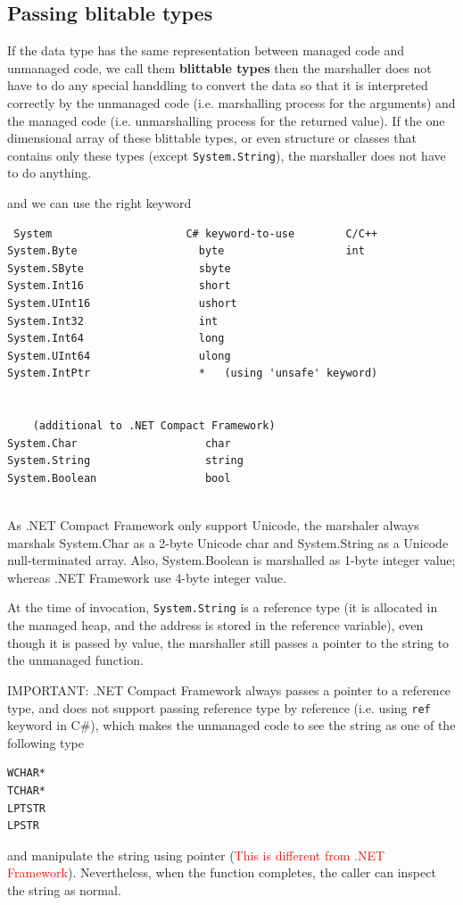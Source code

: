 \subsection{Passing blitable types}
\label{sec:marshall_blittable-types}

If the data type has the same representation between managed code and unmanaged
code, we call them {\bf blittable types} then the marshaller does not have to do
any special handdling to convert the data so that it is interpreted correctly by
the unmanaged code (i.e. marshalling process for the arguments) and
the managed code (i.e. unmarshalling process for the returned value). If the one
dimensional array of these blittable types, or even structure or classes that
contains only these types (except \verb!System.String!), the marshaller does not
have to do anything.

and we can use the right keyword
\begin{verbatim}
 System                     C# keyword-to-use        C/C++
System.Byte                   byte                   int
System.SByte                  sbyte
System.Int16                  short
System.UInt16                 ushort
System.Int32                  int
System.Int64                  long
System.UInt64                 ulong
System.IntPtr                 *   (using 'unsafe' keyword)


    (additional to .NET Compact Framework)
System.Char                    char
System.String                  string
System.Boolean                 bool
    
\end{verbatim}
As .NET Compact Framework only support Unicode, the  marshaler always marshals
System.Char as a 2-byte Unicode char and System.String as a Unicode
null-terminated array. Also, System.Boolean is marshalled as 1-byte integer
value; whereas .NET Framework use 4-byte integer value. 

At the time of invocation, \verb!System.String! is a reference type (it is
allocated in the managed heap, and the address is stored in the reference
variable), even though it is passed by value, the marshaller still passes a
pointer to the string to the unmanaged function.

IMPORTANT: .NET Compact Framework always passes a pointer to a reference type,
and does not support passing reference type by reference (i.e. using \verb!ref!
keyword in C\#), which makes the unmanaged code to see the string as one of the
following type
\begin{verbatim}
WCHAR*
TCHAR*
LPTSTR
LPSTR
\end{verbatim}
and manipulate the string using pointer (\textcolor{red}{This is different
from .NET Framework}). Nevertheless, when the function completes, the caller can
inspect the string as normal. 

